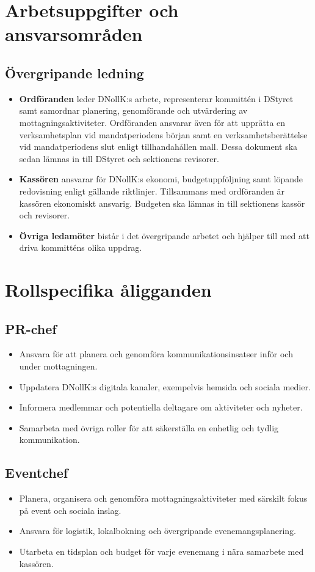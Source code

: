 \documentclass[a4paper]{dtekinstruktion}
\begin{document}
\section{Arbetsuppgifter och ansvarsområden}
\subsection{Övergripande ledning}
\begin{itemize}
  \item \textbf{Ordföranden} leder DNollK:s arbete, representerar kommittén i DStyret samt samordnar planering, genomförande och utvärdering av mottagningsaktiviteter. Ordföranden ansvarar även för att upprätta en verksamhetsplan vid mandatperiodens början samt en verksamhetsberättelse vid mandatperiodens slut enligt tillhandahållen mall. Dessa dokument ska sedan lämnas in till DStyret och sektionens revisorer.
  \item \textbf{Kassören} ansvarar för DNollK:s ekonomi, budgetuppföljning samt löpande redovisning enligt gällande riktlinjer. Tillsammans med ordföranden är kassören ekonomiskt ansvarig. Budgeten ska lämnas in till sektionens kassör och revisorer.
  \item \textbf{Övriga ledamöter} bistår i det övergripande arbetet och hjälper till med att driva kommitténs olika uppdrag.
\end{itemize}

\section{Rollspecifika åligganden}
\subsection{PR-chef}
\begin{itemize}
  \item Ansvara för att planera och genomföra kommunikationsinsatser inför och under mottagningen.
  \item Uppdatera DNollK:s digitala kanaler, exempelvis hemsida och sociala medier.
  \item Informera medlemmar och potentiella deltagare om aktiviteter och nyheter.
  \item Samarbeta med övriga roller för att säkerställa en enhetlig och tydlig kommunikation.
\end{itemize}

\subsection{Eventchef}
\begin{itemize}
  \item Planera, organisera och genomföra mottagningsaktiviteter med särskilt fokus på event och sociala inslag.
  \item Ansvara för logistik, lokalbokning och övergripande evenemangsplanering.
  \item Utarbeta en tidsplan och budget för varje evenemang i nära samarbete med kassören.
\end{itemize}
\end{document}
